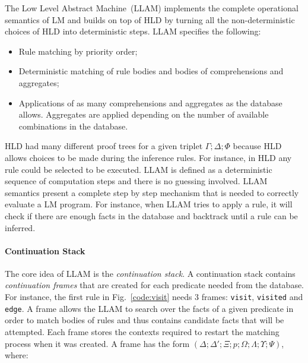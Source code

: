 The Low Level Abstract Machine~(LLAM) implements the complete operational
semantics of LM and builds on top of HLD by turning all the non-deterministic
choices of HLD into deterministic steps. LLAM specifies the following:

\begin{itemize}
   \item Rule matching by priority order;

   \item Deterministic matching of rule bodies and bodies of comprehensions and
      aggregates;

   \item Applications of as many comprehensions and aggregates as the database
      allows. Aggregates are applied depending on the number of available
      combinations in the database.

\end{itemize}

HLD had many different proof trees for a given triplet $\Gamma; \Delta; \Phi$
because HLD allows choices to be made during the inference rules. For instance,
in HLD any rule could be selected to be executed. LLAM is defined as a
deterministic sequence of computation steps and there is no guessing involved.
LLAM semantics present a complete step by step mechanism that is needed to
correctly evaluate a LM program. For instance, when LLAM tries to apply a rule,
it will check if there are enough facts in the database and backtrack until a
rule can be inferred.

\paragraph{Continuation Stack} The core idea of LLAM is the \emph{continuation
stack}. A continuation stack contains \emph{continuation frames} that are
created for each predicate needed from the database. For instance, the first
rule in Fig.~\ref{code:visit} needs 3 frames: \texttt{visit}, \texttt{visited}
and \texttt{edge}. A frame allows the LLAM to search over the facts of a given
predicate in order to match bodies of rules and thus contains candidate facts
that will be attempted. Each frame stores the contexts required to restart the
matching process when it was created. A frame has the form $(\Delta; \Delta';
\Xi; p; \Omega; \Lambda; \Upsilon; \Psi)$, where:

